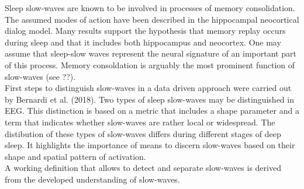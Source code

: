 Sleep slow-waves are known to be involved in processes of memory consolidation. The assumed modes of action have been described in the hippocampal neocortical dialog model. Many results support the hypothesis that memory replay occurs during sleep and that it includes both hippocampus and neocortex. One may assume that sleep-slow waves represent the neural signature of an important part of this process. Memory consoldation is arguably the most prominent function of slow-waves (see ??).\\
First steps to distinguish slow-waves in a data driven approach were carried out by Bernardi et al. (2018). Two types of sleep slow-waves may be distinguished in EEG. This distinction is based on a metric that includes a shape parameter and a term that indicates whether slow-waves are rather local or widespread. The distibution of these types of slow-waves differs during different stages of deep sleep. It highlights the importance of means to discern slow-waves based on their shape and spatial pattern of activation.\\
A working definition that allows to detect and separate slow-waves is derived from the developed understanding of slow-waves. 

